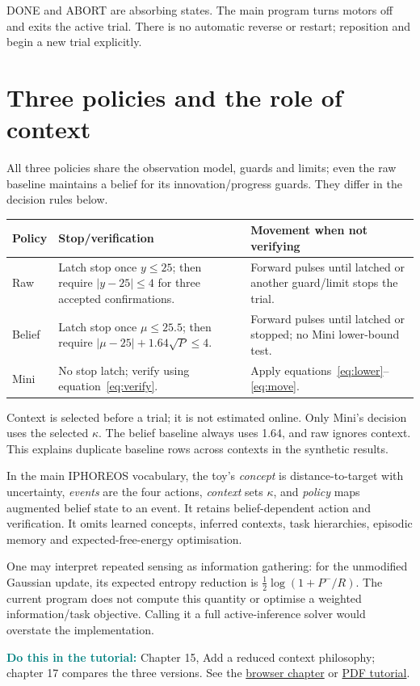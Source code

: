 \documentclass[11pt,a4paper]{article}
\newcommand{\tuto}[2]{\par\textcolor{teal}{\textbf{Do this in the tutorial:}} Chapter #1, #2. See the \href{Tutorial_A_to_Z.html\#t#1}{browser chapter} or \href{Tutorial_A_to_Z.pdf}{PDF tutorial}.\par}
\begin{document}
DONE and ABORT are absorbing states. The main program turns motors off and exits the active trial. There is no automatic reverse or restart; reposition and begin a new trial explicitly.

\section{Three policies and the role of context}
All three policies share the observation model, guards and limits; even the raw baseline maintains a belief for its innovation/progress guards. They differ in the decision rules below.
\begin{longtable}{p{.13\linewidth}p{.36\linewidth}p{.40\linewidth}}
\toprule Policy & Stop/verification & Movement when not verifying\\\midrule\endhead
Raw & Latch stop once $y\leq25$; then require $|y-25|\leq4$ for three accepted confirmations. & Forward pulses until latched or another guard/limit stops the trial.\\
Belief & Latch stop once $\mu\leq25.5$; then require $|\mu-25|+1.64\sqrt P\leq4$. & Forward pulses until latched or stopped; no Mini lower-bound test.\\
Mini & No stop latch; verify using equation~\eqref{eq:verify}. & Apply equations~\eqref{eq:lower}--\eqref{eq:move}.\\
\bottomrule
\end{longtable}
Context is selected before a trial; it is not estimated online. Only Mini's decision uses the selected $\kappa$. The belief baseline always uses 1.64, and raw ignores context. This explains duplicate baseline rows across contexts in the synthetic results.

In the main IPHOREOS vocabulary, the toy's \emph{concept} is distance-to-target with uncertainty, \emph{events} are the four actions, \emph{context} sets $\kappa$, and \emph{policy} maps augmented belief state to an event. It retains belief-dependent action and verification. It omits learned concepts, inferred contexts, task hierarchies, episodic memory and expected-free-energy optimisation.

One may interpret repeated sensing as information gathering: for the unmodified Gaussian update, its expected entropy reduction is $\frac12\log(1+P^-/R)$. The current program does not compute this quantity or optimise a weighted information/task objective. Calling it a full active-inference solver would overstate the implementation.
\tuto{15}{Add a reduced context philosophy; chapter 17 compares the three versions}
\end{document}
